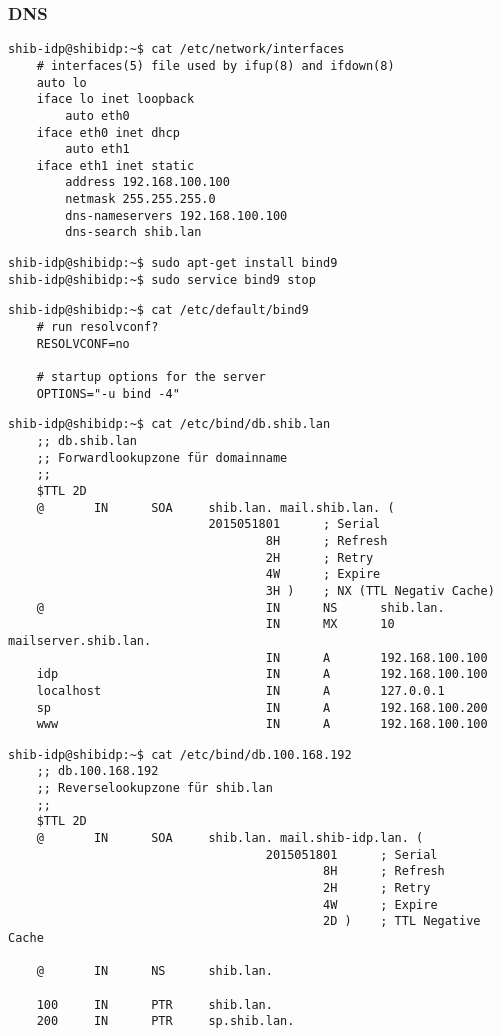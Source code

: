 \subsubsection{DNS}
\begin{lstlisting}
shib-idp@shibidp:~$ cat /etc/network/interfaces
	# interfaces(5) file used by ifup(8) and ifdown(8)
	auto lo
	iface lo inet loopback
		auto eth0
	iface eth0 inet dhcp
		auto eth1
	iface eth1 inet static
		address 192.168.100.100
		netmask 255.255.255.0
		dns-nameservers 192.168.100.100
		dns-search shib.lan
\end{lstlisting}
\begin{lstlisting}
shib-idp@shibidp:~$ sudo apt-get install bind9
shib-idp@shibidp:~$ sudo service bind9 stop
\end{lstlisting}
\begin{lstlisting}
shib-idp@shibidp:~$ cat /etc/default/bind9
	# run resolvconf?
	RESOLVCONF=no

	# startup options for the server
	OPTIONS="-u bind -4"
\end{lstlisting}
\begin{lstlisting}
shib-idp@shibidp:~$ cat /etc/bind/db.shib.lan
	;; db.shib.lan
	;; Forwardlookupzone für domainname
	;;
	$TTL 2D
	@       IN      SOA     shib.lan. mail.shib.lan. (
							2015051801      ; Serial
									8H      ; Refresh
									2H      ; Retry
									4W      ; Expire
									3H )    ; NX (TTL Negativ Cache)
	@                               IN      NS      shib.lan.
									IN      MX      10 mailserver.shib.lan.
									IN      A       192.168.100.100
	idp                             IN      A       192.168.100.100
	localhost                       IN      A       127.0.0.1
	sp                              IN      A       192.168.100.200
	www                             IN      A       192.168.100.100

\end{lstlisting}
\begin{lstlisting}
shib-idp@shibidp:~$ cat /etc/bind/db.100.168.192
	;; db.100.168.192
	;; Reverselookupzone für shib.lan
	;;
	$TTL 2D
	@       IN      SOA     shib.lan. mail.shib-idp.lan. (
									2015051801      ; Serial
											8H      ; Refresh
											2H      ; Retry
											4W      ; Expire
											2D )    ; TTL Negative Cache

	@       IN      NS      shib.lan.

	100     IN      PTR     shib.lan.
	200     IN      PTR     sp.shib.lan.
\end{lstlisting}

